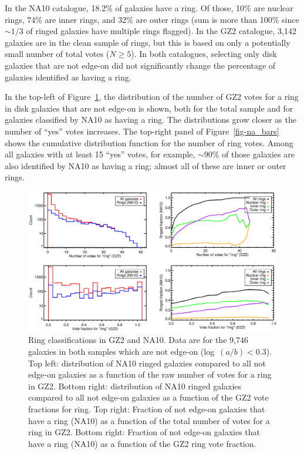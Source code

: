 \documentclass[useAMS,usenatbib]{mn2e}
\begin{document}
In the NA10 catalogue, 18.2\% of galaxies have a ring. Of those, 10\% are nuclear rings, 74\% are inner rings, and 32\% are outer rings (sum is more than 100\% since $\sim1/3$ of ringed galaxies have multiple rings flagged). In the GZ2 catalogue, 3,142 galaxies are in the clean sample of rings, but this is based on only a potentially small number of total votes ($N\geq5$). In both catalogues, selecting only disk galaxies that are not edge-on did not significantly change the percentage of galaxies identified as having a ring. 

In the top-left of Figure~\ref{fig-na_rings}, the distribution of the number of GZ2 votes for a ring in disk galaxies that are not edge-on is shown, both for the total sample and for galaxies classified by NA10 as having a ring. The distributions grow closer as the number of ``yes'' votes increases. The top-right panel of Figure~\ref{fig-na_bars} shows the cumulative distribution function for the number of ring votes. Among all galaxies with at least 15 ``yes'' votes, for example, $\sim90\%$ of those galaxies are also identified by NA10 as having a ring; almost all of these are inner or outer rings.  

\begin{figure}
\includegraphics[angle=0,width=7.0in]{figures/na_rings_axial.eps}
\caption{Ring classifications in GZ2 and NA10. Data are for the 9,746 galaxies in both samples which are not edge-on (log~$(a/b)<0.3$). Top left: distribution of NA10 ringed galaxies compared to all not edge-on galaxies as a function of the raw number of votes for a ring in GZ2. Bottom right: distribution of NA10 ringed galaxies compared to all not edge-on galaxies as a function of the GZ2 vote fractions for ring. Top right: Fraction of not edge-on galaxies that have a ring (NA10) as a function of the total number of votes for a ring in GZ2. Bottom right: Fraction of not edge-on galaxies that have a ring (NA10) as a function of the GZ2 ring vote fraction. 
\label{fig-na_rings}}
\end{figure}
\end{document}
